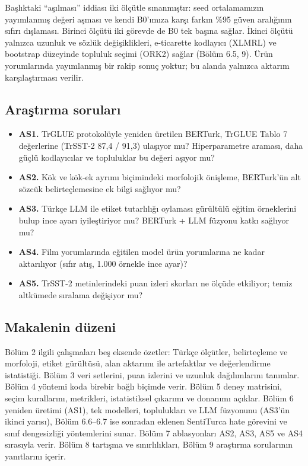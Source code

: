 \documentclass[11pt]{article}
\begin{document}
Başlıktaki ``aşılması'' iddiası iki ölçütle sınanmıştır: seed ortalamamızın yayımlanmış değeri aşması ve kendi B0'ımıza karşı farkın \%95 güven aralığının sıfırı dışlaması. Birinci ölçütü iki görevde de B0 tek başına sağlar. İkinci ölçütü yalnızca uzunluk ve sözlük değişiklikleri, e-ticarette kodlayıcı (XLMRL) ve bootstrap düzeyinde topluluk seçimi (ORK2) sağlar (Bölüm 6.5, 9). Ürün yorumlarında yayımlanmış bir rakip sonuç yoktur; bu alanda yalnızca aktarım karşılaştırması verilir.

\subsection{Araştırma soruları}

\begin{itemize}
\item \textbf{AS1.} TrGLUE protokolüyle yeniden üretilen BERTurk, TrGLUE Tablo 7 değerlerine (TrSST-2 87,4 / 91,3) ulaşıyor mu? Hiperparametre araması, daha güçlü kodlayıcılar ve topluluklar bu değeri aşıyor mu?
\item \textbf{AS2.} Kök ve kök-ek ayrımı biçimindeki morfolojik önişleme, BERTurk'ün alt sözcük belirteçlemesine ek bilgi sağlıyor mu?
\item \textbf{AS3.} Türkçe LLM ile etiket tutarlılığı oylaması gürültülü eğitim örneklerini bulup ince ayarı iyileştiriyor mu? BERTurk + LLM füzyonu katkı sağlıyor mu?
\item \textbf{AS4.} Film yorumlarında eğitilen model ürün yorumlarına ne kadar aktarılıyor (sıfır atış, 1.000 örnekle ince ayar)?
\item \textbf{AS5.} TrSST-2 metinlerindeki puan izleri skorları ne ölçüde etkiliyor; temiz altkümede sıralama değişiyor mu?
\end{itemize}

\subsection{Makalenin düzeni}

Bölüm 2 ilgili çalışmaları beş eksende özetler: Türkçe ölçütler, belirteçleme ve morfoloji, etiket gürültüsü, alan aktarımı ile artefaktlar ve değerlendirme istatistiği. Bölüm 3 veri setlerini, puan izlerini ve uzunluk dağılımlarını tanımlar. Bölüm 4 yöntemi koda birebir bağlı biçimde verir. Bölüm 5 deney matrisini, seçim kurallarını, metrikleri, istatistiksel çıkarımı ve donanımı açıklar. Bölüm 6 yeniden üretimi (AS1), tek modelleri, toplulukları ve LLM füzyonunu (AS3'ün ikinci yarısı), Bölüm 6.6–6.7 ise sonradan eklenen SentiTurca hate görevini ve sınıf dengesizliği yöntemlerini sunar. Bölüm 7 ablasyonları AS2, AS3, AS5 ve AS4 sırasıyla verir. Bölüm 8 tartışma ve sınırlılıkları, Bölüm 9 araştırma sorularının yanıtlarını içerir.
\end{document}
